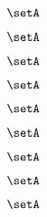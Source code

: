 \begin{forslides}
     \begin{equation}
        \label{eq:combination-181}
        \setA
    \end{equation}
    
     \begin{equation}
        \label{eq:combination-182}
        \setA
    \end{equation}
    
    \begin{equation}
        \label{eq:combination-183}
        \setA
    \end{equation}
    
     \begin{equation}
        \label{eq:combination-184}
        \setA
    \end{equation}
    
     \begin{equation}
        \label{eq:combination-185}
        \setA
    \end{equation}
    
    \begin{equation}
        \label{eq:combination-186}
        \setA
    \end{equation}
    
     \begin{equation}
        \label{eq:combination-187}
        \setA
    \end{equation}
    
     \begin{equation}
        \label{eq:combination-188}
        \setA
    \end{equation}
    
    \begin{equation}
        \label{eq:combination-189}
       \setA
    \end{equation}

    

    



\end{forslides}